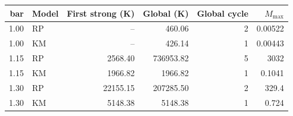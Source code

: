 \begin{tabular}{rlrrrr}
\toprule
bar & Model & First strong (K) & Global (K) & Global cycle & $M_{\max}$ \\
\midrule
1.00 & RP & -- & 460.06 & 2 & 0.00522 \\
1.00 & KM & -- & 426.14 & 1 & 0.00443 \\
1.15 & RP & 2568.40 & 736953.82 & 5 & 3032 \\
1.15 & KM & 1966.82 & 1966.82 & 1 & 0.1041 \\
1.30 & RP & 22155.15 & 207285.50 & 2 & 329.4 \\
1.30 & KM & 5148.38 & 5148.38 & 1 & 0.724 \\
\bottomrule
\end{tabular}
